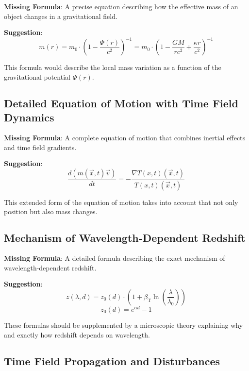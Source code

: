 \documentclass[12pt,a4paper]{article}
\newcommand{\Tfieldt}{T(x,t)}
\newcommand{\betaT}{\beta_{\text{T}}}
\newcommand{\vecx}{\vec{x}}
\begin{document}
	\textbf{Missing Formula}: A precise equation describing how the effective mass of an object changes in a gravitational field.
	
	\textbf{Suggestion}:
	\begin{equation}
		m(r) = m_0 \cdot \left(1 - \frac{\Phi(r)}{c^2}\right)^{-1} = m_0 \cdot \left(1 - \frac{GM}{rc^2} + \frac{\kappa r}{c^2}\right)^{-1}
	\end{equation}
	
	This formula would describe the local mass variation as a function of the gravitational potential $\Phi(r)$.
	
	\subsection{Detailed Equation of Motion with Time Field Dynamics}
	\label{subsec:detailed_motion}
	
	\textbf{Missing Formula}: A complete equation of motion that combines inertial effects and time field gradients.
	
	\textbf{Suggestion}:
	\begin{equation}
		\frac{d(m(\vecx,t)\vec{v})}{dt} = -\frac{\nabla\Tfieldt(\vecx,t)}{\Tfieldt(\vecx,t)}
	\end{equation}
	
	This extended form of the equation of motion takes into account that not only position but also mass changes.
	
	\subsection{Mechanism of Wavelength-Dependent Redshift}
	\label{subsec:wavelength_mechanism}
	
	\textbf{Missing Formula}: A detailed formula describing the exact mechanism of wavelength-dependent redshift.
	
	\textbf{Suggestion}:
	\begin{equation}
		z(\lambda,d) = z_0(d) \cdot \left(1 + \betaT \ln\left(\frac{\lambda}{\lambda_0}\right)\right)
	\end{equation}
	\begin{equation}
		z_0(d) = e^{\alpha d} - 1
	\end{equation}
	
	These formulas should be supplemented by a microscopic theory explaining why and exactly how redshift depends on wavelength.
	
	\subsection{Time Field Propagation and Disturbances}
	\label{subsec:field_propagation}
	
\end{document}
